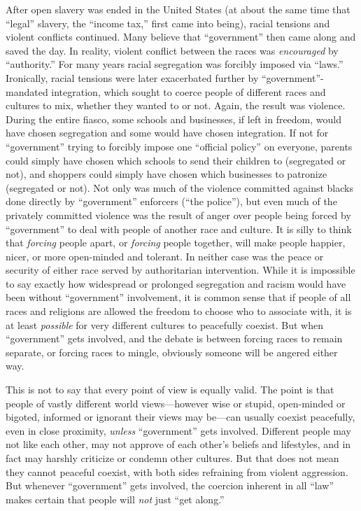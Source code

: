 \documentclass{book}
\begin{document}
After open slavery was ended in the United States (at about the same time that \enquote{legal} slavery, the \enquote{income tax,} first came into being), racial tensions and violent conflicts continued. Many believe that \enquote{government} then came along and saved the day. In reality, violent conflict between the races was \emph{encouraged} by \enquote{authority.} For many years racial segregation was forcibly imposed via \enquote{laws.} Ironically, racial tensions were later exacerbated further by \enquote{government}-mandated integration, which sought to coerce people of different races and cultures to mix, whether they wanted to or not. Again, the result was violence. During the entire fiasco, some schools and businesses, if left in freedom, would have chosen segregation and some would have chosen integration. If not for \enquote{government} trying to forcibly impose one \enquote{official policy} on everyone, parents could simply have chosen which schools to send their children to (segregated or not), and shoppers could simply have chosen which businesses to patronize (segregated or not). Not only was much of the violence committed against blacks done directly by \enquote{government} enforcers (\enquote{the police}), but even much of the privately committed violence was the result of anger over people being forced by \enquote{government} to deal with people of another race and culture. It is silly to think that \emph{forcing} people apart, or \emph{forcing} people together, will make people happier, nicer, or more open-minded and tolerant. In neither case was the peace or security of either race served by authoritarian intervention. While it is impossible to say exactly how widespread or prolonged segregation and racism would have been without \enquote{government} involvement, it is common sense that if people of all races and religions are allowed the freedom to choose who to associate with, it is at least \emph{possible} for very different cultures to peacefully coexist. But when \enquote{government} gets involved, and the debate is between forcing races to remain separate, or forcing races to mingle, obviously someone will be angered either way.

This is not to say that every point of view is equally valid. The point is that people of vastly different world views---however wise or stupid, open-minded or bigoted, informed or ignorant their views may be---can usually coexist peacefully, even in close proximity, \emph{unless} \enquote{government} gets involved. Different people may not like each other, may not approve of each other's beliefs and lifestyles, and in fact may harshly criticize or condemn other cultures. But that does not mean they cannot peaceful coexist, with both sides refraining from violent aggression. But whenever \enquote{government} gets involved, the coercion inherent in all \enquote{law} makes certain that people will \emph{not} just \enquote{get along.}
\end{document}
